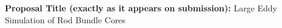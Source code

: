 \documentclass[9pt,landscape]{article}
\begin{document}
\setlength{\parindent}{0in} %

\pagestyle{fancy}   \renewcommand{%
\headrulewidth}{0.0pt}

\textbf{Proposal Title (exactly as it appears on submission):} Large Eddy Simulation of Rod Bundle Cores

%
%
%
%
\vspace{-.5cm}
\end{document}
